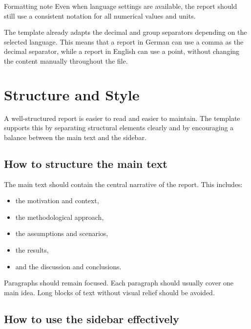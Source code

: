 \documentclass[11pt,a4paper]{report}
\begin{document}
\begin{sideNote}[blue]{Formatting note}
Even when language settings are available, the report should still use a consistent notation for all numerical values and units.
\end{sideNote}

The template already adapts the decimal and group separators depending on the selected language. This means that a report in German can use a comma as the decimal separator, while a report in English can use a point, without changing the content manually throughout the file.

\clearpage


\chapter{Structure and Style}

A well-structured report is easier to read and easier to maintain. The template supports this by separating structural elements clearly and by encouraging a balance between the main text and the sidebar.

\section{How to structure the main text}

The main text should contain the central narrative of the report. This includes:
\begin{itemize}
    \item the motivation and context,
    \item the methodological approach,
    \item the assumptions and scenarios,
    \item the results,
    \item and the discussion and conclusions.
\end{itemize}

Paragraphs should remain focused. Each paragraph should usually cover one main idea. Long blocks of text without visual relief should be avoided.

\section{How to use the sidebar effectively}
\end{document}
